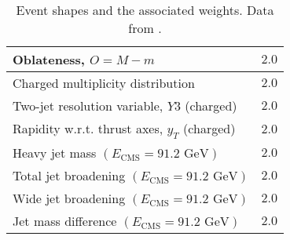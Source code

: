 \documentclass[aps,preprint,floatfix,nofootinbib,showpacs]{revtex4-1}
\begin{document}
\begin{table}[tbp]
\begin{center}
\begin{tabular}{l|l}
Oblateness, $O=M-m$                                            & \hspace{1cm} $2.0$ \\ \hline
Charged multiplicity distribution                              & \hspace{1cm} $2.0$ \\ \hline
Two-jet resolution variable, $Y3$ (charged)                    & \hspace{1cm} $2.0$ \\ \hline
Rapidity w.r.t. thrust axes, $y_T$ (charged)                   & \hspace{1cm} $2.0$ \\ \hline
Heavy jet mass $(E_{\text{CMS}} = 91.2 \text{ GeV})$           & \hspace{1cm} $2.0$ \\ \hline
Total jet broadening $(E_{\text{CMS}} = 91.2 \text{ GeV})$     & \hspace{1cm} $2.0$ \\ \hline
Wide jet broadening $(E_{\text{CMS}} = 91.2 \text{ GeV})$      & \hspace{1cm} $2.0$ \\ \hline
Jet mass difference $(E_{\text{CMS}} = 91.2 \text{ GeV})$      & \hspace{1cm} $2.0$ \\ \hline
\hline
\end{tabular}
\end{center}
\caption{Event shapes and the associated weights. Data from 
\cite{Decamp:1991uz, Barate:1996fi, Heister:2003aj, Abreu:1996na, Achard:2004sv, Abbiendi:2004qz}. }
\label{Tab4}
 \end{table}
 
\end{document}
